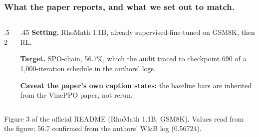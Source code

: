 \documentclass[aspectratio=169,11pt]{beamer}
\newcommand{\source}[1]{\vfill{\scriptsize\color{Gray}#1\par}}
\begin{document}
\begin{frame}[t]
\frametitle{What the paper reports, and what we set out to match.}
\begin{columns}[T,onlytextwidth]
\begin{column}{.52\textwidth}
\end{column}
\begin{column}{.45\textwidth}
\textbf{Setting.} RhoMath 1.1B, already supervised-fine-tuned on GSM8K, then RL.
\medskip

\textbf{Target.} SPO-chain, 56.7\%, which the audit traced to checkpoint 690 of a
1,000-iteration schedule in the authors' logs.
\medskip

\textbf{Caveat the paper's own caption states:} the baseline bars are inherited from the
VinePPO paper, not rerun.
\end{column}
\end{columns}
\source{Figure 3 of the official README (RhoMath 1.1B, GSM8K). Values read from the figure; 56.7 confirmed from the authors' W\&B log (0.56724).}
\end{frame}
\end{document}
